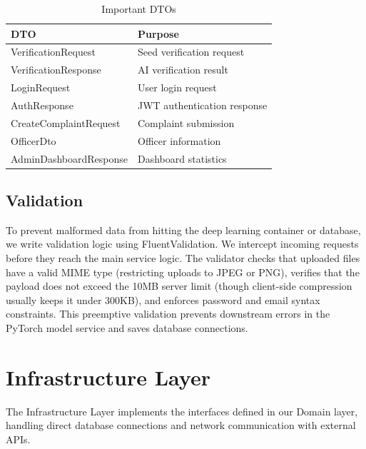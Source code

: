 \begin{table}[htbp]
\centering
\caption{Important DTOs}
\label{tab:important-dtos}
\small
\renewcommand{\arraystretch}{1.1}

\begin{tabularx}{\textwidth}{|p{5.2cm}|X|}
\hline
\textbf{DTO} & \textbf{Purpose} \\
\hline
VerificationRequest & Seed verification request \\
\hline
VerificationResponse & AI verification result \\
\hline
LoginRequest & User login request \\
\hline
AuthResponse & JWT authentication response \\
\hline
CreateComplaintRequest & Complaint submission \\
\hline
OfficerDto & Officer information \\
\hline
AdminDashboardResponse & Dashboard statistics \\
\hline
\end{tabularx}
\end{table}

\subsection{Validation}
To prevent malformed data from hitting the deep learning container or database, we write validation logic using FluentValidation. We intercept incoming requests before they reach the main service logic. The validator checks that uploaded files have a valid MIME type (restricting uploads to JPEG or PNG), verifies that the payload does not exceed the 10MB server limit (though client-side compression usually keeps it under 300KB), and enforces password and email syntax constraints. This preemptive validation prevents downstream errors in the PyTorch model service and saves database connections.

\section{Infrastructure Layer}
\label{sec:infrastructure-layer}

The Infrastructure Layer implements the interfaces defined in our Domain layer, handling direct database connections and network communication with external APIs.

